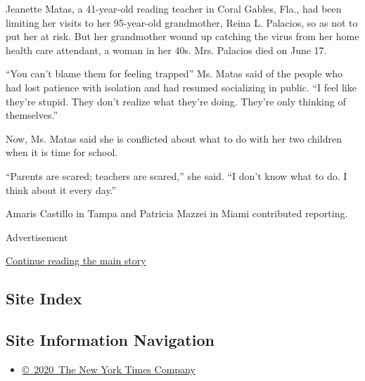 Jeanette Matas, a 41-year-old reading teacher in Coral Gables, Fla., had
been limiting her visits to her 95-year-old grandmother, Reina L.
Palacios, so as not to put her at risk. But her grandmother wound up
catching the virus from her home health care attendant, a woman in her
40s. Mrs. Palacios died on June 17.

``You can't blame them for feeling trapped'' Ms. Matas said of the
people who had lost patience with isolation and had resumed socializing
in public. ``I feel like they're stupid. They don't realize what they're
doing. They're only thinking of themselves.''

Now, Ms. Matas said she is conflicted about what to do with her two
children when it is time for school.

``Parents are scared; teachers are scared,'' she said. ``I don't know
what to do. I think about it every day.''

Amaris Castillo in Tampa and Patricia Mazzei in Miami contributed
reporting.

Advertisement

\protect\hyperlink{after-bottom}{Continue reading the main story}

\hypertarget{site-index}{%
\subsection{Site Index}\label{site-index}}

\hypertarget{site-information-navigation}{%
\subsection{Site Information
Navigation}\label{site-information-navigation}}

\begin{itemize}
\tightlist
\item
  \href{https://help.nytimes3xbfgragh.onion/hc/en-us/articles/115014792127-Copyright-notice}{©~2020~The
  New York Times Company}
\end{itemize}

